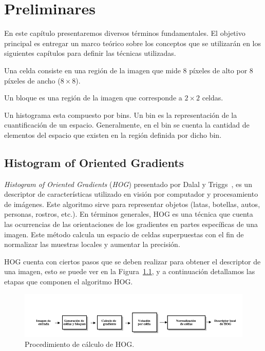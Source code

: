 \chapter[Preliminares ]{Preliminares }\label{ch:capitulo3}

En este capítulo presentaremos diversos términos fundamentales. El objetivo principal es entregar un marco teórico sobre los conceptos que se utilizarán en los siguientes capítulos para definir las técnicas utilizadas.
\begin{definition}[Celdas]
\label{def:cel}
Una celda consiste en una región de la imagen que mide $8$ píxeles de alto por $8$ píxeles de ancho ($8 \times 8$).
\end{definition}

\begin{definition}[Bloques]
\label{def:blo}
Un bloque es una región de la imagen que corresponde a $2 \times 2$ celdas.
\end{definition}

\begin{definition}[Bins]
\label{def:bin}
Un histograma esta compuesto por bins. Un bin es la representación de la cuantificación de un espacio. Generalmente, en el bin se cuenta la cantidad de elementos del espacio que existen en la región definida por dicho bin. 
\end{definition}

\section{Histogram of Oriented Gradients}\label{subsec:hog}
\textit{Histogram of Oriented Gradients} (\textit{HOG}) presentado por Dalal y Triggs~\cite{hog2005}, es un descriptor de características utilizado en visión por computador y procesamiento de imágenes. Este algoritmo sirve para representar objetos (latas, botellas, autos, personas, rostros, etc.). En términos generales, HOG es una técnica que cuenta las ocurrencias de las orientaciones de los gradientes en partes específicas de una imagen. Este método calcula un espacio de celdas superpuestas con el fin de normalizar las muestras locales y aumentar la precisión.

HOG cuenta con ciertos pasos que se deben realizar para obtener el descriptor de una imagen, esto se puede ver en la Figura~\ref{fig:hog_procedure}, y a continuación detallamos las etapas que componen el algoritmo HOG.

\begin{figure}[tb]
  \centering
   \includegraphics[width=1\textwidth]{Figuras/hog-procedure.png}
   \caption{Procedimiento de cálculo de HOG.}
   \label{fig:hog_procedure}
\end{figure}

